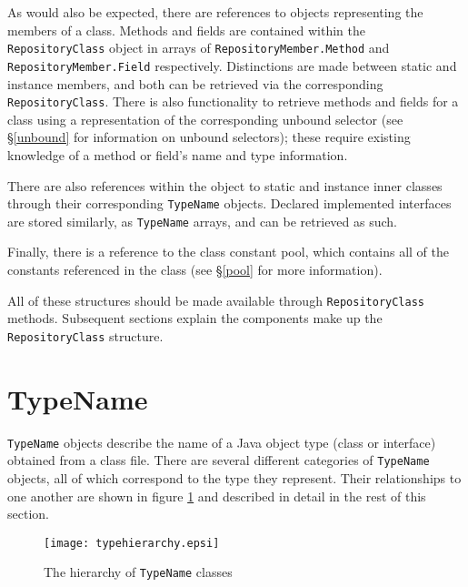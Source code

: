 \documentclass{report}
\begin{document}

As would also be expected, there are references to objects representing the 
members of a class. Methods and fields are contained within the
\texttt{Repository\-Class} object in arrays of 
\texttt{Re\-pos\-i\-tory\-Mem\-ber.Meth\-od} and 
\texttt{RepositoryMem\-ber.Field} respectively. Distinctions are made
between static and instance members, and both can be retrieved via the
corresponding \texttt{Re\-pos\-i\-tory\-Class}. There is also functionality to
retrieve methods and fields for a class using a representation of the 
corresponding unbound selector (see \S \ref{unbound} for information on 
unbound selectors); these require existing knowledge of a method or field's
name and type information. 

There are also references within the object to static and instance inner 
classes through their corresponding \texttt{TypeName} objects. Declared
implemented interfaces are stored similarly, as \texttt{TypeName} arrays,
and can be retrieved as such. 

Finally, there is a reference to the class constant pool, which contains
all of the constants referenced in the class (see \S \ref{pool} for
more information).

All of these structures should be made available through
\texttt{Re\-pos\-i\-tory\-Class} methods. Subsequent sections explain the 
components make up the \texttt{Repository\-Class} structure.

\newpage

\section{TypeName}\label{typename}

\texttt{TypeName} objects describe the name of a Java object type
(class or interface) obtained from a class file. There are several
different categories of \texttt{TypeName} objects, all of which correspond
to the type they represent. Their relationships to one another are shown in 
figure \ref{type_graphic} and described in detail in the rest of this section.

\begin{figure}[htb]
\begin{center}
\texttt{[image: typehierarchy.epsi]}
\caption{The hierarchy of \texttt{TypeName} classes}
\label{type_graphic}
\end{center}
\end{figure}
\end{document}
